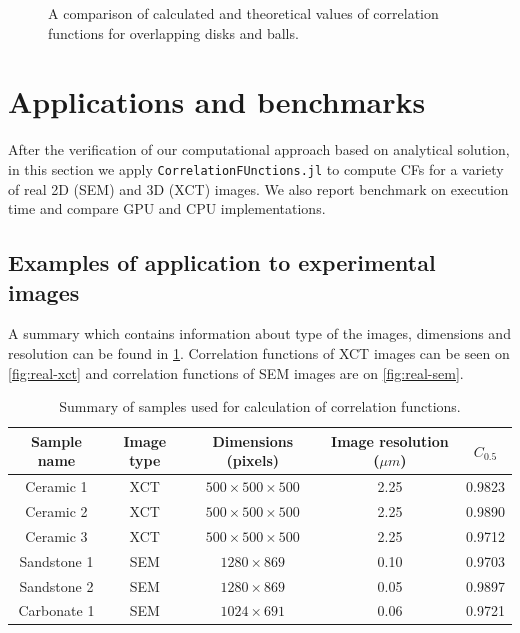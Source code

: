 \documentclass[reprint,amsmath,amssymb,aps,pre,showkeys,showpacs,nofootinbib]{revtex4-1}
\newcommand{\code}[1]{\colorbox{light-gray}{\texttt{#1}}}
\begin{document}
\begin{figure}[tp]
{    \label{fig:ps}}
  \hfill
  \caption[]{A comparison of calculated and theoretical values of correlation
    functions for overlapping disks and balls.}
  \label{fig:verification}
\end{figure}

\section{Applications and benchmarks}
After the verification of our computational approach based on analytical
solution, in this section we apply \code{CorrelationFUnctions.jl} to compute CFs
for a variety of real 2D (SEM) and 3D (XCT) images. We also report benchmark on
execution time and compare GPU and CPU implementations.

\subsection{Examples of application to experimental images}
\label{sec:examples}
A summary which contains information about type of the images, dimensions and resolution
can be found in \cref{tab:samples}. Correlation functions of XCT images can be
seen on \cref{fig:real-xct} and correlation functions of SEM images are on
\cref{fig:real-sem}.

\begin{table}[!pt]
  \centering
  \begin{ruledtabular}
    \begin{tabular}{|c|c|c|c|c|}
      Sample name & Image type & Dimensions (pixels) & Image resolution ($\mu m$) & $C_{0.5}$\\
      \hline
      Ceramic 1   & XCT & $500 \times 500 \times 500$ & 2.25 & 0.9823 \\
      Ceramic 2   & XCT & $500 \times 500 \times 500$ & 2.25 & 0.9890 \\
      Ceramic 3   & XCT & $500 \times 500 \times 500$ & 2.25 & 0.9712 \\
      Sandstone 1 & SEM &  $1280 \times 869$ & 0.10 & 0.9703 \\
      Sandstone 2 & SEM &  $1280 \times 869$ & 0.05 & 0.9897 \\
      Carbonate 1 & SEM &  $1024 \times 691$ & 0.06 & 0.9721
    \end{tabular}
  \end{ruledtabular}
  \caption{Summary of samples used for calculation of correlation functions.}
  \label{tab:samples}
\end{table}
\end{document}
